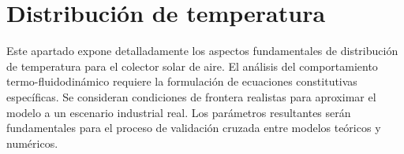 \section{Distribución de temperatura}
\label{sec:cap09_temperatura}

Este apartado expone detalladamente los aspectos fundamentales de distribución de temperatura para el colector solar de aire.
El análisis del comportamiento termo-fluidodinámico requiere la formulación de ecuaciones constitutivas específicas.
Se consideran condiciones de frontera realistas para aproximar el modelo a un escenario industrial real.
Los parámetros resultantes serán fundamentales para el proceso de validación cruzada entre modelos teóricos y numéricos.

